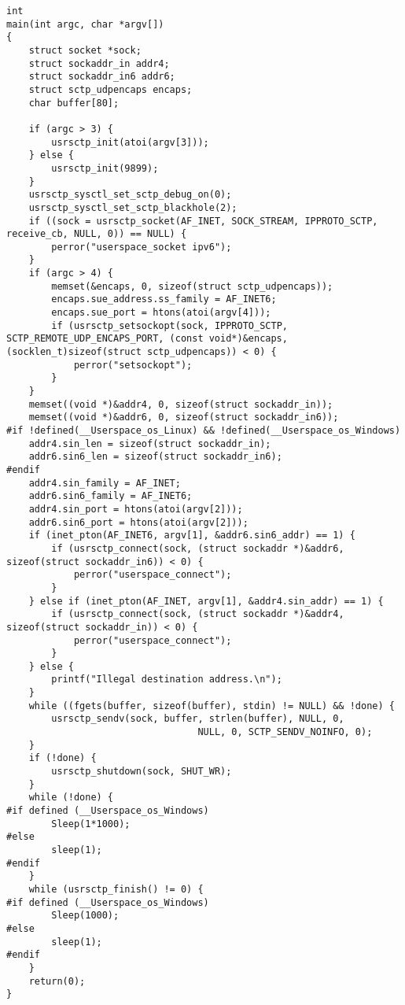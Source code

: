 \documentclass[a4paper]{article}
\begin{document}
\begin{verbatim}
int
main(int argc, char *argv[])
{
	struct socket *sock;
	struct sockaddr_in addr4;
	struct sockaddr_in6 addr6;
	struct sctp_udpencaps encaps;
	char buffer[80];

	if (argc > 3) {
		usrsctp_init(atoi(argv[3]));
	} else {
		usrsctp_init(9899);
	}
	usrsctp_sysctl_set_sctp_debug_on(0);
	usrsctp_sysctl_set_sctp_blackhole(2);
	if ((sock = usrsctp_socket(AF_INET, SOCK_STREAM, IPPROTO_SCTP, receive_cb, NULL, 0)) == NULL) {
		perror("userspace_socket ipv6");
	}
	if (argc > 4) {
		memset(&encaps, 0, sizeof(struct sctp_udpencaps));
		encaps.sue_address.ss_family = AF_INET6;
		encaps.sue_port = htons(atoi(argv[4]));
		if (usrsctp_setsockopt(sock, IPPROTO_SCTP, SCTP_REMOTE_UDP_ENCAPS_PORT, (const void*)&encaps, (socklen_t)sizeof(struct sctp_udpencaps)) < 0) {
			perror("setsockopt");
		}
	}
	memset((void *)&addr4, 0, sizeof(struct sockaddr_in));
	memset((void *)&addr6, 0, sizeof(struct sockaddr_in6));
#if !defined(__Userspace_os_Linux) && !defined(__Userspace_os_Windows)
	addr4.sin_len = sizeof(struct sockaddr_in);
	addr6.sin6_len = sizeof(struct sockaddr_in6);
#endif
	addr4.sin_family = AF_INET;
	addr6.sin6_family = AF_INET6;
	addr4.sin_port = htons(atoi(argv[2]));
	addr6.sin6_port = htons(atoi(argv[2]));
	if (inet_pton(AF_INET6, argv[1], &addr6.sin6_addr) == 1) {
		if (usrsctp_connect(sock, (struct sockaddr *)&addr6, sizeof(struct sockaddr_in6)) < 0) {
			perror("userspace_connect");
		}
	} else if (inet_pton(AF_INET, argv[1], &addr4.sin_addr) == 1) {
		if (usrsctp_connect(sock, (struct sockaddr *)&addr4, sizeof(struct sockaddr_in)) < 0) {
			perror("userspace_connect");
		}
	} else {
		printf("Illegal destination address.\n");
	}
	while ((fgets(buffer, sizeof(buffer), stdin) != NULL) && !done) {
		usrsctp_sendv(sock, buffer, strlen(buffer), NULL, 0,
				                  NULL, 0, SCTP_SENDV_NOINFO, 0);
	}
	if (!done) {
		usrsctp_shutdown(sock, SHUT_WR);
	}
	while (!done) {
#if defined (__Userspace_os_Windows)
		Sleep(1*1000);
#else
		sleep(1);
#endif
	}
	while (usrsctp_finish() != 0) {
#if defined (__Userspace_os_Windows)
		Sleep(1000);
#else
		sleep(1);
#endif
	}
	return(0);
}

\end{verbatim}

%
\end{document}
